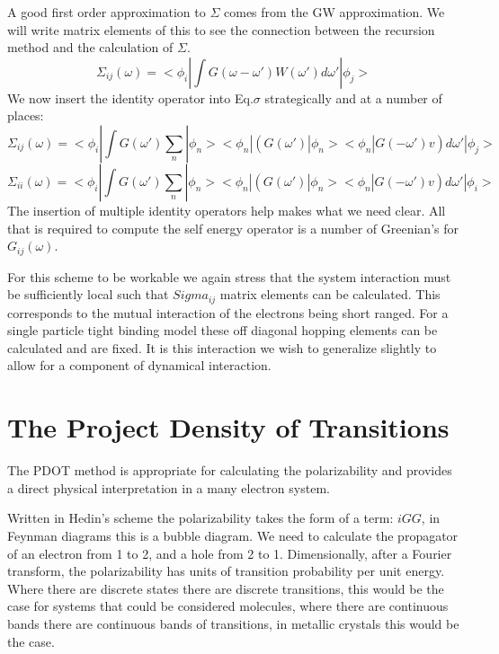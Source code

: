 \documentclass{article}
\begin{document}
A good first order approximation to $\Sigma$ comes from the GW approximation.
We will write matrix elements of this to see the connection between the
recursion method and the calculation of $\Sigma$. 
%
\begin{equation}
\label{eq:sigma}
\Sigma_{ij}(\omega) = <\phi_{i}|\int G(\omega-\omega')W(\omega')d\omega'|\phi_{j}>
\end{equation}
%
	We now insert the identity operator into Eq.$\sigma$ strategically and at 
a number of places:
%
\begin{equation}
\label{eq:sigma}
\Sigma_{ij}(\omega) = <\phi_{i}|\int G(\omega')\sum_{n}|\phi_{n}><\phi_{n}|(G(\omega')|\phi_{n}><\phi_{n}|G(-\omega')v)d\omega'|\phi_{j}>
\end{equation}
%
\begin{equation}
\label{eq:sigma_onsite}%
\Sigma_{ii}(\omega) = <\phi_{i}|\int G(\omega')\sum_{n}|\phi_{n}><\phi_{n}|(G(\omega')|\phi_{n}><\phi_{n}|G(-\omega')v)d\omega'|\phi_{i}>
\end{equation}
%
	The insertion of multiple identity operators
help makes what we need clear. All that is required 
to compute the self energy operator is a number of Greenian's for $G_{ij}(\omega)$. 

For this scheme to be workable we again stress that the system interaction
must be sufficiently local such that $Sigma_{ij}$ matrix elements can be
calculated. This corresponds to the mutual interaction of the electrons being 
short ranged. For a single particle tight binding model these off diagonal hopping
elements can be calculated and are fixed. It is this interaction we wish
to generalize slightly to allow for a component of dynamical interaction.

\section{The Project Density of Transitions}
  The PDOT\cite{annett93, haydock00, haydock16} method is 
appropriate for calculating the polarizability and provides a direct physical
interpretation in a many electron system. 

Written in Hedin's scheme the polarizability 
takes the form of a term: $iGG$, in Feynman diagrams this is a bubble diagram. We need to calculate the propagator
of an electron from 1 to 2, and a hole from 2 to 1. Dimensionally, after a Fourier transform,
the polarizability has units of transition probability per unit energy. Where there are discrete
states there are discrete transitions, this would be the case for systems
that could be considered molecules, where there are continuous bands there are continuous
bands of transitions, in metallic crystals this would be the case.
\end{document}
